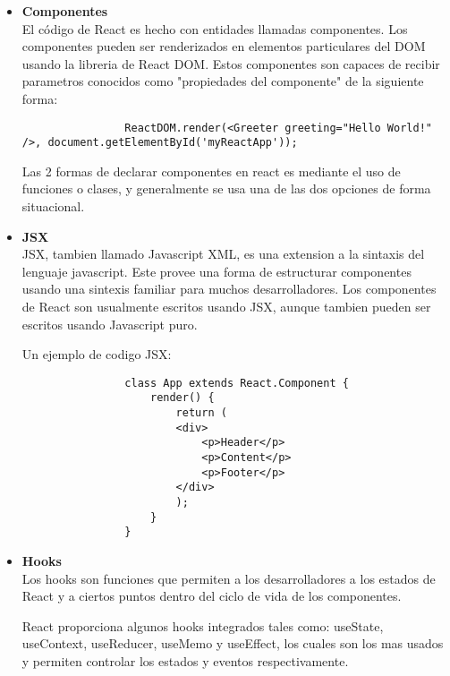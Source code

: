         \begin{itemize}
            \item \textbf{Componentes} \hfill \\

            El código de React es hecho con entidades llamadas componentes. Los componentes pueden ser renderizados en elementos particulares del DOM usando la libreria de React DOM. Estos componentes son capaces de recibir parametros conocidos como "propiedades del componente" de la siguiente forma: \hfill \\

            \begin{lstlisting}
                ReactDOM.render(<Greeter greeting="Hello World!" />, document.getElementById('myReactApp'));
            \end{lstlisting}

            Las 2 formas de declarar componentes en react es mediante el uso de funciones o clases, y generalmente se usa una de las dos opciones de forma situacional.

            \item \textbf{JSX} \hfill \\

            JSX, tambien llamado Javascript XML, es una extension a la sintaxis del lenguaje javascript. Este provee una forma de estructurar componentes usando una sintexis familiar para muchos desarrolladores. Los componentes de React son usualmente escritos usando JSX, aunque tambien pueden ser escritos usando Javascript puro.

            Un ejemplo de codigo JSX:

            \begin{lstlisting}
                class App extends React.Component {
                    render() {
                        return (
                        <div>
                            <p>Header</p>
                            <p>Content</p>
                            <p>Footer</p>
                        </div>
                        );
                    }
                }
            \end{lstlisting}

            \item \textbf{Hooks} \hfill \\

            Los hooks son funciones que permiten a los desarrolladores  a los estados de React y a ciertos puntos dentro del ciclo de vida de los componentes.

            React proporciona algunos hooks integrados tales como: useState, useContext, useReducer, useMemo y useEffect, los cuales son los mas usados y permiten controlar los estados y eventos respectivamente.


        \end{itemize}

